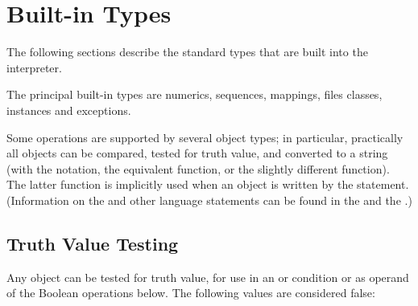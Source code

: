 \section{Built-in Types \label{types}}

The following sections describe the standard types that are built into
the interpreter.

The principal built-in types are numerics, sequences, mappings, files
classes, instances and exceptions.

Some operations are supported by several object types; in particular,
practically all objects can be compared, tested for truth value,
and converted to a string (with the  notation,
the equivalent  function, or the slightly different
 function).  The latter
function is implicitly used when an object is written by the
 statement.
(Information on the 
and other language statements can be found in the
 and the
.)


\subsection{Truth Value Testing\label{truth}}

Any object can be tested for truth value, for use in an  or
 condition or as operand of the Boolean operations below.
The following values are considered false:

